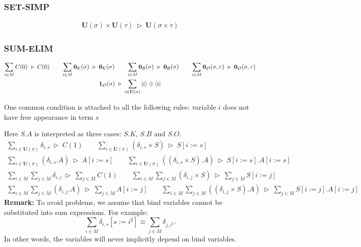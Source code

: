 \documentclass[manuscript, review, timestamp]{acmart}
\newcommand*{\reduce}{\ \triangleright\ }
\begin{document}
\subsubsection*{\textsf{SET-SIMP}}
\begin{gather*}
  \mathbf{U}(\sigma) \times \mathbf{U}(\tau) \reduce \mathbf{U}(\sigma \times \tau)
\end{gather*}

\subsubsection*{\textsf{SUM-ELIM}}
\begin{gather*}
  \sum_{i \in M} C(0) \reduce C(0)
  \qquad
  \sum_{i \in M} \mathbf{0}_\mathcal{K}(\sigma) \reduce \mathbf{0}_\mathcal{K}(\sigma)
  \qquad
  \sum_{i \in M} \mathbf{0}_\mathcal{B}(\sigma) \reduce \mathbf{0}_\mathcal{B}(\sigma)
  \qquad
  \sum_{i \in M} \mathbf{0}_\mathcal{O}(\sigma, \tau) \reduce \mathbf{0}_\mathcal{O}(\sigma, \tau)\\
  \mathbf{1}_\mathcal{O}(\sigma) \reduce \sum_{i \in \mathbf{U}(\sigma)} \ket{i}\otimes\bra{i}
\end{gather*}

One common condition is attached to all the following rules: variable $i$ does not have free appearance in term $s$

Here $S.A$ is interpreted as three cases: $S.K$, $S.B$ and $S.O$.
\begin{gather*}
  \sum_{i \in \mathbf{U}(\sigma)} \delta_{i, s} \reduce C(1)
  \qquad
  \sum_{i \in \mathbf{U}(\sigma)} (\delta_{i, s} \times S) \reduce S[i:=s] \\
  \sum_{i \in \mathbf{U}(\sigma)} (\delta_{i, s}.A) \reduce A[i:=s]
  \qquad
  \sum_{i \in \mathbf{U}(\sigma)} ((\delta_{i, s} \times S).A) \reduce S[i:=s].A[i:=s]
\end{gather*}
\begin{gather*}
  \sum_{i \in M} \sum_{j \in M} \delta_{i, j} \reduce \sum_{j \in M} C(1)
  \qquad
  \sum_{i \in M} \sum_{j \in M} (\delta_{i, j} \times S) \reduce \sum_{j \in M} S[i:=j] \\
  \sum_{i \in M} \sum_{j \in M} (\delta_{i, j}.A) \reduce \sum_{j \in M} A[i:=j]
  \qquad
  \sum_{i \in M} \sum_{j \in M} ((\delta_{i, j} \times S).A) \reduce \sum_{j \in M} S[i:=j].A[i:=j]
\end{gather*}
\textbf{Remark:} To avoid problems, we assume that bind variables cannot be substituted into sum expressions. For example:
$$
\sum_{i \in M} \delta_{i, s}[s:=i^2] \equiv \sum_{j \in M} \delta_{j, i^2}.
$$
In other words, the variables will never implicitly depend on bind variables.
\end{document}
